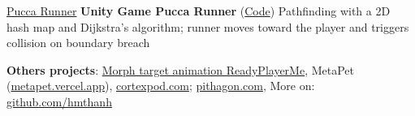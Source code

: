 \cvspace

\begin{twocolentry}{\href{https://puccarunner.github.io}{Pucca Runner}}
	\textbf{Unity Game Pucca Runner} (\href{https://github.com/hmthanh/pucca_runner}{Code}) Pathfinding with a 2D hash map and Dijkstra’s algorithm; runner moves toward the player and triggers collision on boundary breach
\end{twocolentry}

%
%	
%	



\cvspace

%	

\cvspace

\begin{onecolentry}
	\textbf{Others projects}: \href{https://hmthanh.github.io/3d-human-model}{Morph target animation ReadyPlayerMe}, MetaPet (\href{https://metapet.vercel.app}{metapet.vercel.app}), \href{https://cortexpod.com}{cortexpod.com};  \href{https://pithagon.com}{pithagon.com}, More on: \href{http://github.com/hmthanh}{github.com/hmthanh}
\end{onecolentry}

